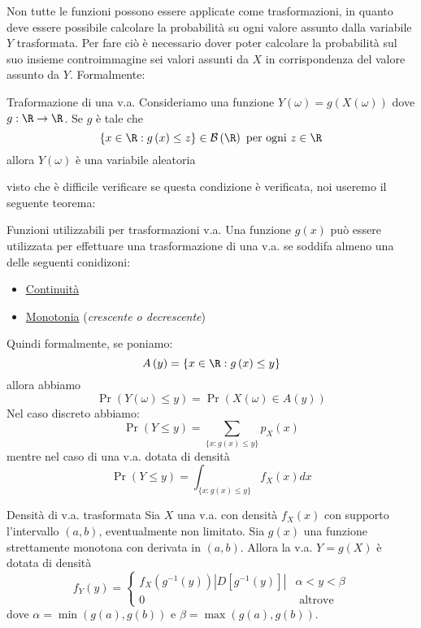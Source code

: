 Non tutte le funzioni possono essere applicate come trasformazioni, in quanto deve essere possibile calcolare la probabilità su ogni valore assunto dalla variabile $ Y $ trasformata. Per fare ciò è necessario dover poter calcolare la probabilità sul suo insieme controimmagine sei valori assunti da $ X $ in corrispondenza del valore assunto da $ Y $. Formalmente:
\begin{definizione}{Traformazione di una v.a.}
	Consideriamo una funzione $  Y \left(\omega \right) = g\left(X \left(\omega \right)\right) $ dove $ g : \R  \to  \R  $. Se $ g $ è tale che
	\[
		\left\{ x \in  \R  : g\left(x\right) \le  z \right\} \in  \mathcal{B}\left(\R \right)\text{ per ogni }z \in  \R
	\]
	allora $ Y\left(\omega \right) $ è una variabile aleatoria
\end{definizione}
visto che è difficile verificare se questa condizione è verificata, noi useremo il seguente teorema:
\begin{teorema}{Funzioni utilizzabili per trasformazioni v.a.}
	Una funzione $ g\left(x\right) $ può essere utilizzata per effettuare una trasformazione di una v.a. se soddifa almeno una delle seguenti conidizoni:
	\begin{itemize}
		\item \underline{Continuità}
		\item \underline{Monotonia} (\textit{crescente o decrescente})
	\end{itemize}
\end{teorema}
\label{requisiti trasformazione}
Quindi formalmente, se poniamo:
\[
	A \left(y\right) = \left\{ x \in  \R : g\left(x\right) \le  y\right\}
\]
allora abbiamo
\[
	\Pr(Y(\omega) \leq y)=\Pr(X(\omega) \in A(y))
\]
Nel caso discreto abbiamo:
\[
	\Pr(Y \leq y)=\sum_{\{x: g(x) \leq y\}} p_X(x)
\]
mentre nel caso di una v.a. dotata di densità
\[
	\Pr(Y \leq y)=\int_{\{x: g(x) \leq y\}} f_X(x) d x
\]
\begin{teorema}{Densità di v.a. trasformata}
	Sia $X$ una v.a. con densità $f_X(x)$ con supporto l'intervallo $(a, b)$, eventualmente non limitato. Sia $g(x)$ una funzione strettamente monotona con derivata in $(a, b)$.
	Allora la v.a. $Y=g(X)$ è dotata di densità
	\[
		f_Y(y)= \begin{cases}f_X\left(g^{-1}(y)\right)\left|D\left[g^{-1}(y)\right]\right| & \alpha<y<\beta \\ 0 & \text { altrove }\end{cases}
	\]
	dove $\alpha=\min (g(a), g(b))$ e $\beta=\max (g(a), g(b))$.
\end{teorema}
\label{trasformazioni}
